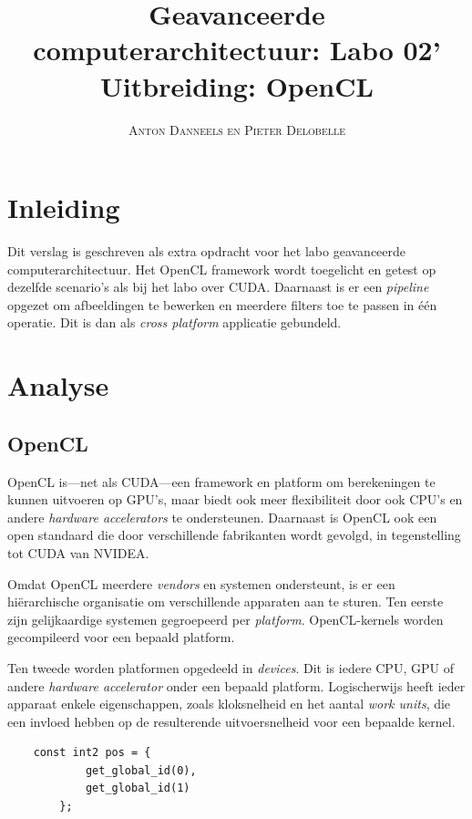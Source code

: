 \documentclass[twocolumn, a4paper]{article}
\begin{document}
\title{Geavanceerde computerarchitectuur: Labo 02' \\ 
\large{Uitbreiding: OpenCL}}
\author{\textsc{Anton Danneels en Pieter Delobelle}}
\date{}
\maketitle

\section{Inleiding}
Dit verslag is geschreven als extra opdracht voor het labo geavanceerde computerarchitectuur. Het OpenCL framework wordt toegelicht en getest op dezelfde scenario's als bij het labo over CUDA. Daarnaast is er een \emph{pipeline} opgezet om afbeeldingen te bewerken en meerdere filters toe te passen in één operatie. Dit is dan als \emph{cross platform} applicatie gebundeld. 

\section{Analyse}

\subsection{OpenCL}
OpenCL is---net als CUDA---een framework en platform om berekeningen te kunnen uitvoeren op GPU's, maar biedt ook meer flexibiliteit door ook CPU's en andere \emph{hardware accelerators} te ondersteunen. Daarnaast is OpenCL ook een open standaard die door verschillende fabrikanten wordt gevolgd, in tegenstelling tot CUDA van NVIDEA.

Omdat OpenCL meerdere \emph{vendors} en systemen ondersteunt, is er een hiërarchische organisatie om verschillende apparaten aan te sturen. Ten eerste zijn gelijkaardige systemen gegroepeerd per \emph{platform}. OpenCL-kernels worden gecompileerd voor een bepaald platform. 

Ten tweede worden platformen opgedeeld in \emph{devices}. Dit is iedere CPU, GPU of andere \emph{hardware accelerator} onder een bepaald platform. Logischerwijs heeft ieder apparaat enkele eigenschappen, zoals kloksnelheid en het aantal \emph{work units}, die een invloed hebben op de resulterende uitvoersnelheid voor een bepaalde kernel.

\begin{verbatim}
    const int2 pos = {
            get_global_id(0), 
            get_global_id(1)
        };
    \end{verbatim}
    \label{c:index}
\end{document}
